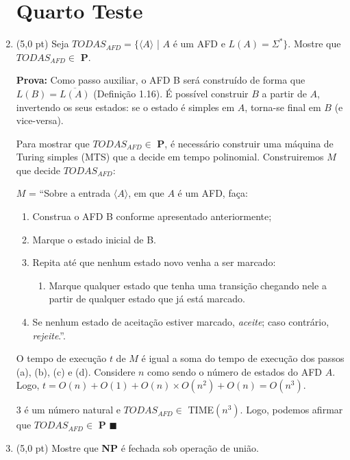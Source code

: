 \documentclass[12pt,a4paper,oneside]{article}
\begin{document}
\begin{enumerate}
	
	\section*{Quarto Teste}
	
	\item (5,0 pt)  Seja $TODAS_{AFD} = \{ \langle A \rangle$ | $A$ é um AFD e $L(A) = \Sigma^*\}$. Mostre que $TODAS_{AFD} \in$ {\bf P}. \\
	
	{ \color{blue}
		{\bf Prova:} Como passo auxiliar, o AFD B será construído de forma que $L(B) = \overline{L(A)}$ (Definição 1.16). É possível construir $B$ a partir de $A$, invertendo os seus estados: se o estado é simples em $A$, torna-se final em $B$ (e vice-versa).
		
		Para mostrar que $TODAS_{AFD} \in$ {\bf P}, é necessário construir uma máquina de Turing simples (MTS) que a decide em tempo polinomial. Construiremos $M$ que decide $TODAS_{AFD}$:
		
		$M$ = ``Sobre a entrada $\langle A \rangle$, em que $A$ é um AFD, faça:
		\begin{enumerate}
			\item Construa o AFD B conforme apresentado anteriormente;
			\item Marque o estado inicial de B.
			\item Repita até que nenhum estado novo venha a ser marcado:
				\begin{enumerate}
					\item Marque qualquer estado que tenha uma transição chegando nele a partir de qualquer estado que já está marcado.
				\end{enumerate}
			\item Se nenhum estado de aceitação estiver marcado, {\it aceite}; caso contrário, {\it rejeite}.''.
		\end{enumerate}
		
		O tempo de execução $t$ de $M$ é igual a soma do tempo de execução dos passos (a), (b), (c) e (d). Considere $n$ como sendo o número de estados do AFD $A$. Logo, $t = O(n) + O(1) + O(n) \times O(n^2) + O(n) = O(n^3)$. 
		
		3 é um número natural e $TODAS_{AFD} \in$ {\sc TIME}$(n^3)$. Logo, podemos afirmar que $TODAS_{AFD}\in$ {\bf P} $\blacksquare$
	}

	\newpage
	
	\item (5,0 pt) Mostre que {\bf NP} é fechada sob operação de união.\\
	

\end{enumerate}
\end{document}
